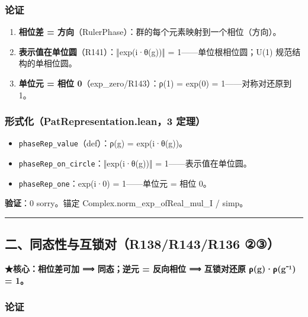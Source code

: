 \documentclass[
]{article}
\providecommand{\tightlist}{%
 \setlength{\itemsep}{0pt}\setlength{\parskip}{0pt}}
\begin{document}
\subsubsection{论证}\label{ux8bbaux8bc1}

\begin{enumerate}
\def\labelenumi{\arabic{enumi}.}
\tightlist
\item
 \textbf{相位差 =
 方向}（RulerPhase）：群的每个元素映射到一个相位（方向）。
\item
 \textbf{表示值在单位圆}（R141）：‖exp(i·θ(g))‖ =
 1------单位根相位圆；U(1) 规范结构的单相位圆。
\item
 \textbf{单位元 = 相位 0}（exp\_zero/R143）：ρ(1) = exp(0) =
 1------对称对还原到 1。
\end{enumerate}

\subsubsection{形式化（PatRepresentation.lean，3
定理）}\label{ux5f62ux5f0fux5316patrepresentation.lean3-ux5b9aux7406}

\begin{itemize}
\tightlist
\item
 \texttt{phaseRep\_value}（def）：ρ(g) = exp(i·θ(g))。
\item
 \texttt{phaseRep\_on\_circle}：‖exp(i·θ(g))‖ = 1------表示值在单位圆。
\item
 \texttt{phaseRep\_one}：exp(i·0) = 1------单位元 = 相位 0。
\end{itemize}

\textbf{验证}：0 sorry。锚定 Complex.norm\_exp\_ofReal\_mul\_I / simp。

\begin{center}\rule{0.5\linewidth}{0.5pt}\end{center}

\subsection{二、同态性与互锁对（R138/R143/R136
②③）}\label{ux4e8cux540cux6001ux6027ux4e0eux4e92ux9501ux5bf9r138r143r136-ux2461ux2462}

\textbf{★核心：相位差可加 ⟹ 同态；逆元 = 反向相位 ⟹ 互锁对还原
ρ(g)·ρ(g⁻¹) = 1。}

\subsubsection{论证}\label{ux8bbaux8bc1-1}
\end{document}
